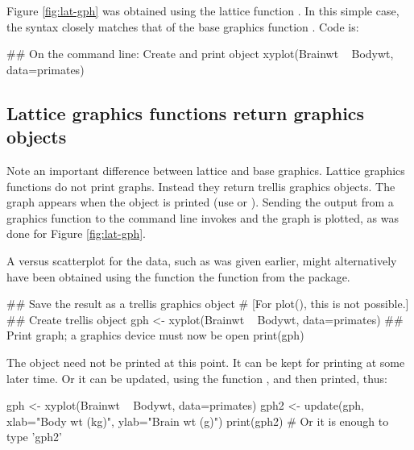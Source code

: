 Figure \ref{fig:lat-gph} was obtained using the lattice function
. In this simple case, the syntax closely matches
that of the base graphics function . Code is:

\begin{Schunk}
\begin{Sinput}
## On the command line: Create and print object
xyplot(Brainwt ~ Bodywt, data=primates)
\end{Sinput}
\end{Schunk}

\subsection*{Lattice graphics functions return graphics objects}
Note an important difference between lattice and base graphics.
Lattice graphics functions do not print graphs. Instead they return
trellis graphics objects.  The graph appears when the object is
printed (use  or ).  Sending the output
from a  graphics function to the command line invokes
 and the graph is plotted, as was done for Figure
\ref{fig:lat-gph}.

A  versus  scatterplot for the
 data, such as was given earlier, might alternatively
have been obtained using the function the function 
from the  package.

\begin{Schunk}
\begin{Sinput}
## Save the result as a trellis graphics object
# [For plot(), this is not possible.]
## Create trellis object
gph <- xyplot(Brainwt ~ Bodywt, data=primates)
## Print graph; a graphics device must now be open
print(gph)
\end{Sinput}
\end{Schunk}
The object  need not be printed at this point.  It can be
kept for printing at some later time.  Or it can be updated, using the
function , and then printed, thus:
\begin{Schunk}
\begin{Sinput}
gph <- xyplot(Brainwt ~ Bodywt, data=primates)
gph2 <- update(gph, xlab="Body wt (kg)",
               ylab="Brain wt (g)")
print(gph2)  # Or it is enough to type 'gph2'
\end{Sinput}
\end{Schunk}

